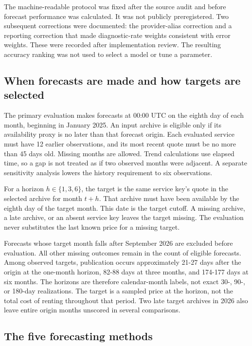 \documentclass[10pt]{article}
\begin{document}
The machine-readable protocol was fixed after the source audit and before forecast performance was calculated. It was not publicly preregistered. Two subsequent corrections were documented: the provider-alias correction and a reporting correction that made diagnostic-rate weights consistent with error weights. These were recorded after implementation review. The resulting accuracy ranking was not used to select a model or tune a parameter.

\subsection{When forecasts are made and how targets are selected}

The primary evaluation makes forecasts at 00:00 UTC on the eighth day of each month, beginning in January 2025. An input archive is eligible only if its availability proxy is no later than that forecast origin. Each evaluated service must have 12 earlier observations, and its most recent quote must be no more than 45 days old. Missing months are allowed. Trend calculations use elapsed time, so a gap is not treated as if two observed months were adjacent. A separate sensitivity analysis lowers the history requirement to six observations.

For a horizon $h\in\{1,3,6\}$, the target is the same service key's quote in the selected archive for month $t+h$. That archive must have been available by the eighth day of the target month. This date is the target cutoff. A missing archive, a late archive, or an absent service key leaves the target missing. The evaluation never substitutes the last known price for a missing target.

Forecasts whose target month falls after September 2026 are excluded before evaluation. All other missing outcomes remain in the count of eligible forecasts. Among observed targets, publication occurs approximately 21-27 days after the origin at the one-month horizon, 82-88 days at three months, and 174-177 days at six months. The horizons are therefore calendar-month labels, not exact 30-, 90-, or 180-day realizations. The target is a sampled price at the horizon, not the total cost of renting throughout that period. Two late target archives in 2026 also leave entire origin months unscored in several comparisons.

\subsection{The five forecasting methods}
\end{document}

